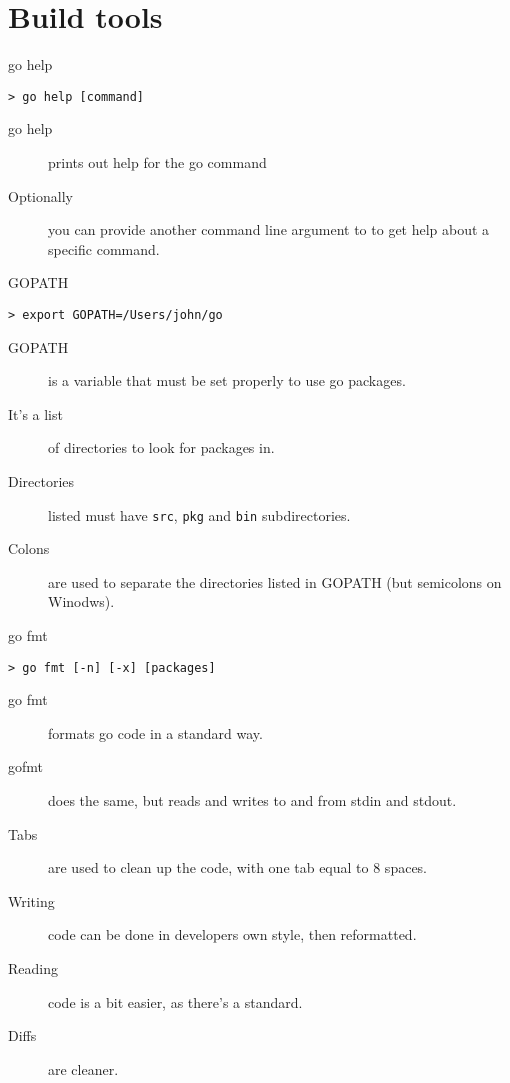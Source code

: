 
\section{Build tools}

\begin{frame}[fragile]{go help}
  \begin{verbatim}
> go help [command]
  \end{verbatim}
  \hr
\begin{description}
    \item[go help] prints out help for the go command
    \item[Optionally] you can provide another command line argument to to get help about a specific command.
  \end{description}
  
\end{frame}


\begin{frame}[fragile]{GOPATH}
  \begin{verbatim}
> export GOPATH=/Users/john/go
  \end{verbatim}
  \hr
\begin{description}
    \item[GOPATH] is a variable that must be set properly to use go packages.
    \item[It's a list] of directories to look for packages in.
    \item[Directories] listed must have \texttt{src}, \texttt{pkg} and \texttt{bin} subdirectories.
    \item[Colons] are used to separate the directories listed in GOPATH (but semicolons on Winodws). 
  \end{description}
  
\end{frame}


\begin{frame}[fragile]{go fmt}
  \begin{verbatim}
> go fmt [-n] [-x] [packages]
  \end{verbatim}
  \hr
\begin{description}
    \item[go fmt] formats go code in a standard way.
    \item[gofmt] does the same, but reads and writes to and from stdin and stdout.
    \item[Tabs] are used to clean up the code, with one tab equal to 8 spaces.
    \item[Writing] code can be done in developers own style, then reformatted.
    \item[Reading] code is a bit easier, as there's a standard.
    \item[Diffs] are cleaner.
  \end{description}
  
\end{frame}



